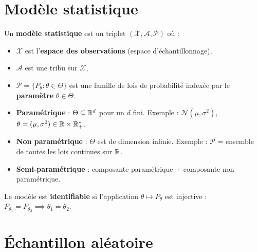 \section{Mod\`ele statistique}

\begin{definition}
Un \textbf{mod\`ele statistique} est un triplet $(\mathcal{X}, \mathcal{A}, \mathcal{P})$ o\`u :
\begin{itemize}
\item $\mathcal{X}$ est l'\textbf{espace des observations} (espace d'\'echantillonnage),
\item $\mathcal{A}$ est une tribu sur $\mathcal{X}$,
\item $\mathcal{P} = \{P_\theta : \theta\in\Theta\}$ est une famille de lois de probabilit\'e index\'ee par le \textbf{param\`etre} $\theta\in\Theta$.
\end{itemize}
\end{definition}

\begin{definition}
\begin{itemize}
\item \textbf{Param\'etrique} : $\Theta\subseteq\mathbb{R}^d$ pour un $d$ fini. Exemple : $\mathcal{N}(\mu,\sigma^2)$, $\theta=(\mu,\sigma^2)\in\mathbb{R}\times\mathbb{R}_+^*$.
\item \textbf{Non param\'etrique} : $\Theta$ est de dimension infinie. Exemple : $\mathcal{P}$ = ensemble de toutes les lois continues sur $\mathbb{R}$.
\item \textbf{Semi-param\'etrique} : composante param\'etrique + composante non param\'etrique.
\end{itemize}
\end{definition}

\begin{definition}[Identifiabilit\'e]
Le mod\`ele est \textbf{identifiable} si l'application $\theta\mapsto P_\theta$ est injective : $P_{\theta_1}=P_{\theta_2}\implies\theta_1=\theta_2$.
\end{definition}

\section{\'Echantillon al\'eatoire}

